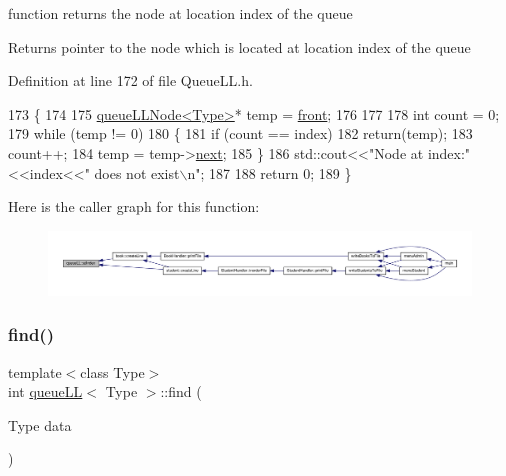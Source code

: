 function returns the node at location index of the queue \begin{DoxyReturn}{Returns}
pointer to the node which is located at location index of the queue 
\end{DoxyReturn}


Definition at line 172 of file Queue\+L\+L.\+h.


\begin{DoxyCode}
173     \{
174 
175         \hyperlink{classqueue_l_l_node}{queueLLNode<Type>}* temp = \hyperlink{classqueue_l_l_a622ea439d113fe8e4616320ec2346d8b}{front};
176 
177 
178         \textcolor{keywordtype}{int} count = 0;
179         \textcolor{keywordflow}{while} (temp != 0)
180         \{
181             \textcolor{keywordflow}{if} (count == index)
182                 \textcolor{keywordflow}{return}(temp);
183             count++;
184             temp = temp->\hyperlink{classqueue_l_l_node_ab8367d61c51828d9f21d72537b62735f}{next};
185         \}
186         std::cout<<\textcolor{stringliteral}{"Node at index:"}<<index<<\textcolor{stringliteral}{" does not exist\(\backslash\)n"};
187 
188         \textcolor{keywordflow}{return} 0;
189     \}
\end{DoxyCode}
Here is the caller graph for this function\+:
\nopagebreak
\begin{figure}[H]
\begin{center}
\leavevmode
\includegraphics[width=350pt]{classqueue_l_l_a6c8873be0f08b3b2e83a24469fbfaa5d_icgraph}
\end{center}
\end{figure}
\mbox{\label{classqueue_l_l_af46d9d07b7528da834c2c37d752c29f5}} 
\subsubsection{\texorpdfstring{find()}{find()}}
{\footnotesize\ttfamily template$<$class Type$>$ \\
int \hyperlink{classqueue_l_l}{queue\+LL}$<$ Type $>$\+::find (\begin{DoxyParamCaption}\item[{Type}]{data }\end{DoxyParamCaption})\hspace{0.3cm}{\ttfamily [inline]}}

